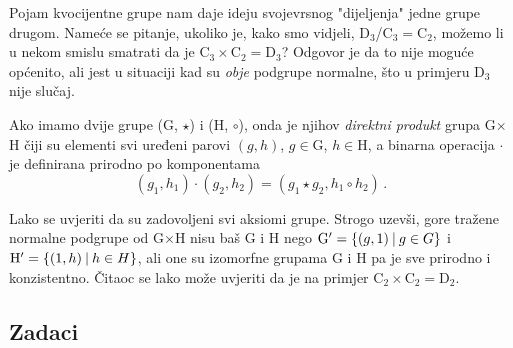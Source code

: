 Pojam kvocijentne grupe nam daje ideju svojevrsnog "dijeljenja" jedne
grupe drugom.
Nameće se pitanje, ukoliko je, kako smo vidjeli, 
$\mathrm{D}_{3}$/$\mathrm{C}_3 = \mathrm{C}_2$, možemo li u nekom smislu
smatrati da je $\mathrm{C}_3 \times \mathrm{C}_2 = \mathrm{D}_3$?
Odgovor je da to nije moguće općenito, ali jest u situaciji kad su
\emph{obje} podgrupe normalne, što u primjeru $\mathrm{D}_3$ nije slučaj.

\begin{definicija}\label{def:direktniproduktgrupa}
Ako imamo dvije grupe (G, $\star$) i (H, $\circ$), onda je njihov
\emph{direktni produkt} grupa G$\times$H čiji su elementi svi uređeni
parovi $(g, h)$, $g \in \mathrm{G}$, $h \in \mathrm{H}$, a 
binarna operacija $\cdot$ je definirana prirodno po komponentama
\begin{equation}
    (g_1, h_1) \cdot (g_2, h_2) = (g_1 \star g_2, h_1 \circ h_2) \,.
    \label{eq:Gproduct}
\end{equation}
\end{definicija}

Lako se uvjeriti da su zadovoljeni svi aksiomi grupe. Strogo 
uzevši, gore tražene normalne podgrupe od G$\times$H nisu baš G i H nego
    $\mathrm{G}' = \{ (g, 1) \: | \: g \in G \}$ i
    $\mathrm{H}' = \{ (1, h) \: | \: h \in H \}$,
ali one su izomorfne grupama G i H pa je sve prirodno i konzistentno.
Čitaoc se lako može uvjeriti da je na primjer
$\mathrm{C}_2 \times \mathrm{C}_2 = \mathrm{D}_2$.

\subsection*{Zadaci}


